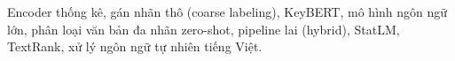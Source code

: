 \documentclass[conference]{IEEEtran}
\begin{document}
\begin{IEEEkeywords}
Encoder thống kê, gán nhãn thô (coarse labeling), KeyBERT, mô hình ngôn ngữ lớn,
phân loại văn bản đa nhãn zero-shot, pipeline lai (hybrid), StatLM, TextRank, xử
lý ngôn ngữ tự nhiên tiếng Việt.
\end{IEEEkeywords}

















\end{document}
